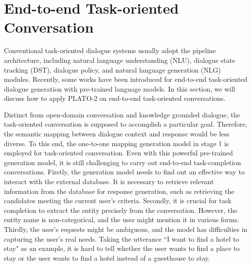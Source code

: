 \documentclass[letterpaper]{article} \usepackage{aaai21}  \usepackage{times}  \usepackage{helvet} \usepackage{courier}  \usepackage[hyphens]{url}  \usepackage{graphicx} \urlstyle{rm} \def\UrlFont{\rm}  \usepackage{natbib}  \usepackage{caption} \frenchspacing  \setlength{\pdfpagewidth}{8.5in}  \setlength{\pdfpageheight}{11in}  \usepackage{amsmath}
\begin{document}
\section{End-to-end Task-oriented Conversation}
Conventional task-oriented dialogue systems usually adopt the pipeline architecture, including natural language understanding (NLU), dialogue state tracking (DST), dialogue policy, and natural language generation (NLG) modules. Recently, some works \cite{ham2020end, peng2020soloist} have been introduced for end-to-end task-oriented dialogue generation with pre-trained language models. In this section, we will discuss how to apply PLATO-2 on end-to-end task-oriented conversations. 

Distinct from open-domain conversation and knowledge grounded dialogue, the task-oriented conversation is supposed to accomplish a particular goal. Therefore, the semantic mapping between dialogue context and response would be less diverse. To this end, the one-to-one mapping generation model in stage 1 is employed for task-oriented conversation. Even with this powerful pre-trained generation model, it is still challenging to carry out end-to-end task-completion conversations. Firstly, the generation model needs to find out an effective way to interact with the external database. It is necessary to retrieve relevant information from the database for response generation, such as retrieving the candidates meeting the current user's criteria. Secondly, it is crucial for task completion to extract the entity precisely from the conversation. However, the entity name is non-categorical, and the user might mention it in various forms. Thirdly, the user's requests might be ambiguous, and the model has difficulties in capturing the user's real needs. Taking the utterance ``I want to find a hotel to stay" as an example, it is hard to tell whether the user wants to find a place to stay or the user wants to find a hotel instead of a guesthouse to stay. 
\end{document}
